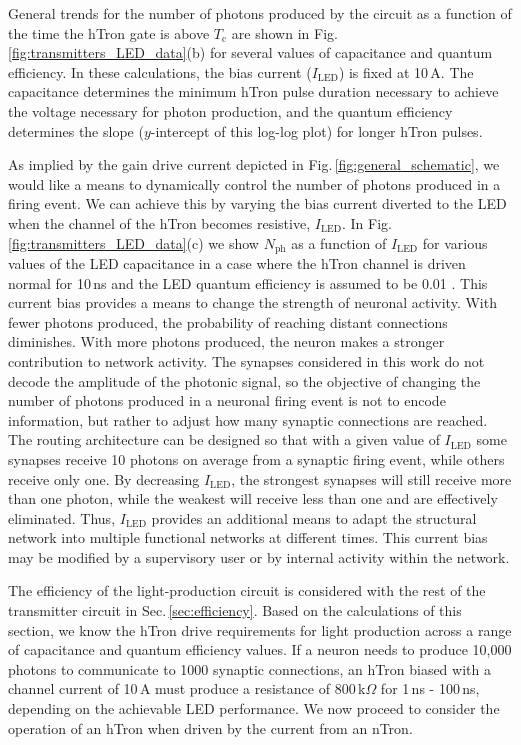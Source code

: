 \documentclass[twocolumn]{article}
\begin{document}
General trends for the number of photons produced by the circuit as a function of the time the hTron gate is above $T_{\mathrm{c}}$ are shown in Fig.\,\ref{fig:transmitters_LED_data}(b) for several values of capacitance and quantum efficiency. In these calculations, the bias current ($I_{\mathrm{LED}}$) is fixed at 10\,\textmu A. The capacitance determines the minimum hTron pulse duration necessary to achieve the voltage necessary for photon production, and the quantum efficiency determines the slope ($y$-intercept of this log-log plot) for longer hTron pulses.

As implied by the gain drive current depicted in Fig.\,\ref{fig:general_schematic}, we would like a means to dynamically control the number of photons produced in a firing event. We can achieve this by varying the bias current diverted to the LED when the channel of the hTron becomes resistive, $I_{\mathrm{LED}}$. In Fig.\,\ref{fig:transmitters_LED_data}(c) we show $N_{\mathrm{ph}}$ as a function of $I_{\mathrm{LED}}$ for various values of the LED capacitance in a case where the hTron channel is driven normal for 10\,ns and the LED quantum efficiency is assumed to be 0.01 \cite{doro2017}. This current bias provides a means to change the strength of neuronal activity. With fewer photons produced, the probability of reaching distant connections diminishes. With more photons produced, the neuron makes a stronger contribution to network activity. The synapses considered in this work do not decode the amplitude of the photonic signal, so the objective of changing the number of photons produced in a neuronal firing event is not to encode information, but rather to adjust how many synaptic connections are reached. The routing architecture can be designed so that with a given value of $I_{\mathrm{LED}}$ some synapses receive 10 photons on average from a synaptic firing event, while others receive only one. By decreasing $I_{\mathrm{LED}}$, the strongest synapses will still receive more than one photon, while the weakest will receive less than one and are effectively eliminated. Thus, $I_{\mathrm{LED}}$ provides an additional means to adapt the structural network into multiple functional networks at different times. This current bias may be modified by a supervisory user or by internal activity within the network.

The efficiency of the light-production circuit is considered with the rest of the transmitter circuit in Sec.\,\ref{sec:efficiency}. Based on the calculations of this section, we know the hTron drive requirements for light production across a range of capacitance and quantum efficiency values. If a neuron needs to produce 10,000 photons to communicate to 1000 synaptic connections, an hTron biased with a channel current of 10\,\textmu A must produce a resistance of 800\,k$\Omega$ for 1\,ns - 100\,ns, depending on the achievable LED performance. We now proceed to consider the operation of an hTron when driven by the current from an nTron.  
	
\end{document}
